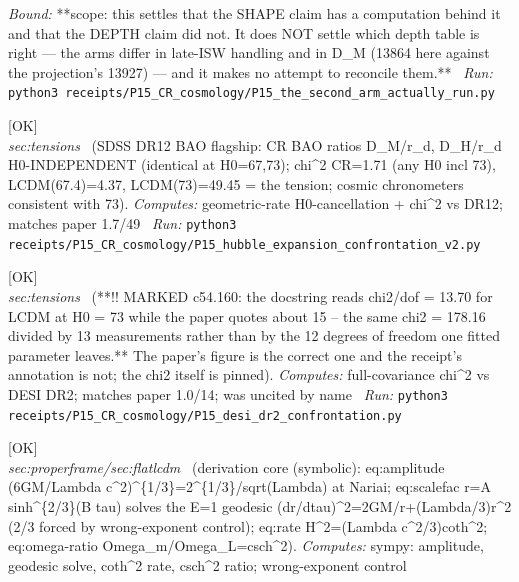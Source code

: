 \begin{description}
 \emph{Bound:} **scope: this settles that the SHAPE claim has a computation behind it and that the DEPTH claim did not. It does NOT settle which depth table is right --- the arms differ in late-ISW handling and in D\_M (13864 here against the projection's 13927) --- and it makes no attempt to reconcile them.**
\ \emph{Run:} \texttt{python3 receipts/P15\_CR\_cosmology/P15\_the\_second\_arm\_actually\_run.py}
\item[\label{rcpt:P15_hubble_expansion_confrontation_v2}\texttt{P15\_hubble\_expansion\_confrontation\_v2}]\hfill\textsf{[OK]}\\
\textit{sec:tensions} \ (SDSS DR12 BAO flagship: CR BAO ratios D\_M/r\_d, D\_H/r\_d H0-INDEPENDENT (identical at H0=67,73); chi\textasciicircum{}2 CR=1.71 (any H0 incl 73), LCDM(67.4)=4.37, LCDM(73)=49.45 = the tension; cosmic chronometers consistent with 73). 
\emph{Computes:} geometric-rate H0-cancellation + chi\textasciicircum{}2 vs DR12; matches paper 1.7/49
\ \emph{Run:} \texttt{python3 receipts/P15\_CR\_cosmology/P15\_hubble\_expansion\_confrontation\_v2.py}
\item[\label{rcpt:P15_desi_dr2_confrontation}\texttt{P15\_desi\_dr2\_confrontation}]\hfill\textsf{[OK]}\\
\textit{sec:tensions} \ (**!! MARKED c54.160: the docstring reads chi2/dof = 13.70 for LCDM at H0 = 73 while the paper quotes about 15 -- the same chi2 = 178.16 divided by 13 measurements rather than by the 12 degrees of freedom one fitted parameter leaves.** The paper's figure is the correct one and the receipt's annotation is not; the chi2 itself is pinned). 
\emph{Computes:} full-covariance chi\textasciicircum{}2 vs DESI DR2; matches paper 1.0/14; was uncited by name
\ \emph{Run:} \texttt{python3 receipts/P15\_CR\_cosmology/P15\_desi\_dr2\_confrontation.py}
\item[\label{rcpt:P15_expansion_law}\texttt{P15\_expansion\_law}]\hfill\textsf{[OK]}\\
\textit{sec:properframe/sec:flatlcdm} \ (derivation core (symbolic): eq:amplitude (6GM/Lambda c\textasciicircum{}2)\textasciicircum{}\{1/3\}=2\textasciicircum{}\{1/3\}/sqrt(Lambda) at Nariai; eq:scalefac r=A sinh\textasciicircum{}\{2/3\}(B tau) solves the E=1 geodesic (dr/dtau)\textasciicircum{}2=2GM/r+(Lambda/3)r\textasciicircum{}2 (2/3 forced by wrong-exponent control); eq:rate H\textasciicircum{}2=(Lambda c\textasciicircum{}2/3)coth\textasciicircum{}2; eq:omega-ratio Omega\_m/Omega\_L=csch\textasciicircum{}2). 
\emph{Computes:} sympy: amplitude, geodesic solve, coth\textasciicircum{}2 rate, csch\textasciicircum{}2 ratio; wrong-exponent control

\end{description}

